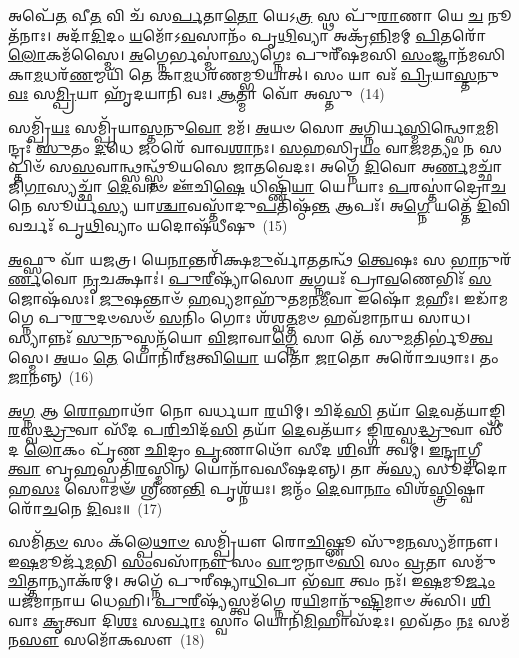 {\anuvakamend[{𑌆 𑌤\-\ul{𑌵𑍋}\-𑌰𑍍𑌜𑌾\-𑌽\-\ul{𑌨𑍁} 𑌷𑍋𑌡᳴𑌶 𑌚}]}%

𑌅𑌪𑍇᳴\-\ul{𑌤} 𑌵𑍀\-\ul{𑌤} 𑌵𑌿 𑌚᳴ 𑌸\-\ul{𑌰𑍍𑌪}\-𑌤𑌾\-\ul{𑌤𑍋} 𑌯𑍇\-𑌽\-\ul{𑌤𑍍𑌰} 𑌸𑍍𑌥 𑌪𑍁᳴\-\ul{𑌰𑌾}\-𑌣𑌾 𑌯𑍇 \ul{𑌚} 𑌨𑍂𑌤᳴𑌨𑌾𑌃। 𑌅𑌦𑌾᳴\-\ul{𑌦𑌿}\-𑌦𑌂 \ul{𑌯}\-𑌮𑍋᳴\-𑌽\-\ul{𑌵}\-𑌸𑌾𑌨𑌂᳴ 𑌪𑍃\-\ul{𑌥𑌿}\-𑌵𑍍𑌯𑌾 𑌅𑌕𑍍𑌰᳴\-\ul{𑌨𑍍𑌨𑌿}\-𑌮𑌮𑍍 \ul{𑌪𑌿}\-𑌤𑌰𑍋᳴ \ul{𑌲𑍋}\-𑌕𑌮᳴𑌸𑍍𑌮𑍈। \ul{𑌅}\-𑌗𑍍𑌨𑍇𑌰𑍍𑌭𑌸𑍍𑌮𑌾॑\-\ul{𑌸𑍍𑌯}\-𑌗𑍍𑌨𑍇𑌃 𑌪𑍁𑌰𑍀᳴𑌷𑌮𑌸𑌿 \ul{𑌸𑌂}\-𑌜𑍍𑌞𑌾𑌨᳴𑌮𑌸𑌿 𑌕𑌾\-\ul{𑌮}\-𑌧𑌰᳴\-\ul{𑌣}\-𑌮𑍍𑌮𑌯𑌿᳴ 𑌤𑍇 𑌕𑌾\-\ul{𑌮}\-𑌧𑌰᳴𑌣𑌮𑍍𑌭𑍂𑌯𑌾𑌤𑍍। 𑌸𑌂 𑌯𑌾 𑌵𑌃᳴ \ul{𑌪𑍍𑌰𑌿}\-𑌯𑌾\-\ul{𑌸𑍍𑌤}\-𑌨𑍁\-\ul{𑌵𑌃} 𑌸\-\ul{𑌮𑍍𑌪𑍍𑌰𑌿}\-𑌯𑌾 𑌹𑍃᳴𑌦𑌯𑌾𑌨𑌿 𑌵𑌃। \ul{𑌆}\-𑌤𑍍𑌮𑌾 𑌵𑍋᳴ 𑌅𑌸𑍍𑌤𑍁~(14)

𑌸𑌮𑍍𑌪𑍍𑌰𑌿᳴\-\ul{𑌯𑌃} 𑌸𑌮𑍍𑌪𑍍𑌰𑌿᳴𑌯𑌾\-\ul{𑌸𑍍𑌤}\-𑌨𑍁\-\ul{𑌵𑍋} 𑌮𑌮᳴। \ul{𑌅}\-𑌯𑍞 𑌸𑍋 \ul{𑌅}\-𑌗𑍍𑌨𑌿𑌰𑍍𑌯\-\ul{𑌸𑍍𑌮𑌿}\-𑌨𑍍𑌥𑍍𑌸𑍋\-\ul{𑌮}\-𑌮𑌿𑌨𑍍𑌦𑍍𑌰𑌃᳴ \ul{𑌸𑍁}\-𑌤𑌂 \ul{𑌦}\-𑌧𑍇 \ul{𑌜}\-𑌠𑌰𑍇᳴ 𑌵𑌾𑌵\-\ul{𑌶𑌾}\-𑌨𑌃। \ul{𑌸}\-\-\ul{𑌹}\-𑌸𑍍𑌰𑌿\-\ul{𑌯𑌂} 𑌵𑌾\-\ul{𑌜}\-𑌮\-\ul{𑌤𑍍𑌯𑌂} 𑌨 𑌸𑌪𑍍𑌤𑌿𑍞᳴ 𑌸\-\ul{𑌸}\-𑌵𑌾𑌨𑍍𑌥𑍍𑌸𑌨𑍍𑌥𑍍𑌸𑍍𑌤𑍂᳴𑌯𑌸𑍇 𑌜𑌾𑌤𑌵𑍇𑌦𑌃। 𑌅𑌗𑍍𑌨𑍇᳴ \ul{𑌦𑌿}\-𑌵𑍋 𑌅\-\ul{𑌰𑍍𑌣}\-𑌮𑌚𑍍𑌛𑌾᳴ 𑌜𑌿\-\ul{𑌗𑌾}\-𑌸𑍍𑌯𑌚𑍍𑌛𑌾᳴ \ul{𑌦𑍇}\-𑌵𑌾𑍞 𑌊᳴𑌚𑌿\-\ul{𑌷𑍇} 𑌧𑌿𑌷𑍍𑌣𑌿᳴\-\ul{𑌯𑌾} 𑌯𑍇। 𑌯𑌾𑌃 \ul{𑌪}\-𑌰𑌸𑍍𑌤𑌾॑𑌦𑍍𑌰𑍋\-\ul{𑌚}\-𑌨𑍇 𑌸𑍂𑌰𑍍𑌯᳴\-\ul{𑌸𑍍𑌯} 𑌯𑌾\-\ul{𑌶𑍍𑌚𑌾}\-𑌵𑌸𑍍𑌤𑌾᳴𑌦𑍁\-\ul{𑌪}\-𑌤𑌿𑌷𑍍𑌠᳴\-\ul{𑌨𑍍𑌤} 𑌆𑌪𑌃᳴। 𑌅\-\ul{𑌗𑍍𑌨𑍇} 𑌯𑌤𑍍𑌤𑍇᳴ \ul{𑌦𑌿}\-𑌵𑌿 𑌵𑌰𑍍𑌚𑌃᳴ 𑌪𑍃\-\ul{𑌥𑌿}\-𑌵𑍍𑌯𑌾𑌂 𑌯𑌦𑍋𑌷᳴𑌧𑍀𑌷𑍁~(15)

\-\ul{𑌅}\-𑌫𑍍𑌸𑍁 𑌵𑌾᳴ 𑌯𑌜𑌤𑍍𑌰। 𑌯𑍇\-\ul{𑌨𑌾}\-𑌨𑍍𑌤𑌰𑌿᳴𑌕𑍍𑌷\-\ul{𑌮𑍁}\-𑌰𑍍𑌵𑌾᳴\-\ul{𑌤}\-𑌤𑌨𑍍𑌥᳴ \ul{𑌤𑍍𑌵𑍇}\-𑌷𑌃 𑌸 \ul{𑌭𑌾}\-𑌨𑍁𑌰᳴\-\ul{𑌰𑍍𑌣}\-𑌵𑍋 \ul{𑌨𑍃}\-𑌚𑌕𑍍𑌷𑌾𑌃॑। \ul{𑌪𑍁}\-\-\ul{𑌰𑍀}\-𑌷𑍍𑌯𑌾᳴𑌸𑍋 \ul{𑌅}\-𑌗𑍍𑌨𑌯𑌃᳴ 𑌪𑍍𑌰𑌾\-\ul{𑌵}\-𑌣𑍇𑌭𑌿𑌃᳴ \ul{𑌸}\-𑌜𑍋𑌷᳴𑌸𑌃। \ul{𑌜𑍁}\-𑌷𑌨𑍍𑌤𑌾𑍞᳴ \ul{𑌹}\-𑌵𑍍𑌯𑌮𑌾𑌹𑍁᳴𑌤𑌮𑌨\-\ul{𑌮𑍀}\-𑌵𑌾 𑌇𑌷𑍋᳴ \ul{𑌮}\-𑌹𑍀𑌃। 𑌇𑌡𑌾᳴𑌮𑌗𑍍𑌨𑍇 𑌪𑍁\-\ul{𑌰𑍁}\-𑌦𑍞𑌸𑍞᳴ \ul{𑌸}\-𑌨𑌿𑌂 𑌗𑍋𑌃 𑌶᳴𑌶𑍍𑌵\-\ul{𑌤𑍍𑌤}\-𑌮𑍞 𑌹𑌵᳴𑌮𑌾𑌨𑌾𑌯 𑌸𑌾𑌧। 𑌸𑍍𑌯𑌾𑌨𑍍𑌨𑌃᳴ \ul{𑌸𑍁}\-𑌨𑍁𑌸𑍍𑌤𑌨᳴𑌯𑍋 \ul{𑌵𑌿}\-𑌜𑌾𑌵𑌾\-\ul{𑌗𑍍𑌨𑍇} 𑌸𑌾 𑌤𑍇᳴ 𑌸𑍁\-\ul{𑌮}\-𑌤𑌿𑌰𑍍𑌭𑍂॑\-\ul{𑌤𑍍𑌵}\-𑌸𑍍𑌮𑍇। \ul{𑌅}\-𑌯𑌂 \ul{𑌤𑍇} 𑌯𑍋𑌨𑌿᳴𑌰𑍍\mbox{}\-\ul{𑌋}\-𑌤𑍍𑌵𑌿\-\ul{𑌯𑍋} 𑌯𑌤𑍋᳴ \ul{𑌜𑌾}\-𑌤𑍋 𑌅𑌰𑍋᳴𑌚𑌥𑌾𑌃। 𑌤𑌂 \ul{𑌜𑌾}\-𑌨𑌨𑍍𑌨𑍍~(16)

\-\ul{𑌅}\-\-\ul{𑌗𑍍𑌨} 𑌆 \ul{𑌰𑍋}\-𑌹𑌾𑌥𑌾᳴ 𑌨𑍋 𑌵𑌰𑍍𑌧𑌯𑌾 \ul{𑌰}\-𑌯𑌿𑌮𑍍। 𑌚𑌿𑌦᳴\-\ul{𑌸𑌿} 𑌤𑌯𑌾᳴ \ul{𑌦𑍇}\-𑌵𑌤᳴𑌯𑌾𑌙𑍍𑌗𑌿\-\ul{𑌰}\-𑌸𑍍𑌵\-\ul{𑌦𑍍𑌧𑍍𑌰𑍁}\-𑌵𑌾 𑌸𑍀᳴𑌦 𑌪\-\ul{𑌰𑌿}\-𑌚𑌿𑌦᳴\-\ul{𑌸𑌿} 𑌤𑌯𑌾᳴ \ul{𑌦𑍇}\-𑌵𑌤᳴𑌯𑌾\-𑌽 𑌙𑍍𑌗𑌿\-\ul{𑌰}\-𑌸𑍍𑌵\-\ul{𑌦𑍍𑌧𑍍𑌰𑍁}\-𑌵𑌾 𑌸𑍀᳴𑌦 \ul{𑌲𑍋}\-𑌕𑌂 𑌪𑍃᳴𑌣 \ul{𑌛𑌿}\-𑌦𑍍𑌰𑌂 \ul{𑌪𑍃}\-𑌣𑌾𑌥𑍋᳴ 𑌸𑍀𑌦 \ul{𑌶𑌿}\-𑌵𑌾 𑌤𑍍𑌵𑌮𑍍। \ul{𑌇}\-\-\ul{𑌨𑍍𑌦𑍍𑌰𑌾}\-𑌗𑍍𑌨𑍀 \ul{𑌤𑍍𑌵𑌾} 𑌬𑍃\-\ul{𑌹}\-𑌸𑍍𑌪𑌤𑌿᳴\-\ul{𑌰}\-𑌸𑍍𑌮𑌿𑌨𑍍 𑌯𑍋𑌨𑌾᳴𑌵𑌸𑍀𑌷𑌦𑌨𑍍𑌨𑍍। 𑌤𑌾 𑌅᳴\-\ul{𑌸𑍍𑌯} 𑌸𑍂𑌦᳴𑌦𑍋𑌹\-\ul{𑌸𑌃} 𑌸𑍋𑌮𑍟᳴ 𑌶𑍍𑌰𑍀𑌣\-\ul{𑌨𑍍𑌤𑌿} 𑌪𑍃𑌶𑍍𑌨᳴𑌯𑌃। 𑌜𑌨𑍍𑌮𑌂᳴ \ul{𑌦𑍇}\-𑌵𑌾\-\ul{𑌨𑌾𑌂} 𑌵𑌿𑌶᳴\-\ul{𑌸𑍍𑌤𑍍𑌰𑌿}\-𑌷𑍍𑌵𑌾 𑌰𑍋᳴\-\ul{𑌚}\-𑌨𑍇 \ul{𑌦𑌿}\-𑌵𑌃॥~(17)

{\anuvakamend[{\-\ul{𑌅}\-𑌸𑍍𑌤𑍍𑌵𑍋𑌷᳴𑌧𑍀𑌷𑍁 \ul{𑌜𑌾}\-𑌨\-\ul{𑌨𑍍𑌨}\-𑌷𑍍𑌟𑌾𑌚᳴𑌤𑍍𑌵𑌾𑌰𑌿𑍞𑌶𑌚𑍍𑌚}]}%

𑌸𑌮𑌿᳴\-\ul{𑌤}\-\-\ul{𑍞} 𑌸𑌂 𑌕᳴𑌲𑍍𑌪𑍇\-\ul{𑌥𑌾}\-\-\ul{𑍞} 𑌸𑌮𑍍𑌪𑍍𑌰𑌿᳴𑌯𑍗 𑌰𑍋\-\ul{𑌚𑌿}\-𑌷𑍍𑌣𑍂 𑌸𑍁᳴𑌮\-\ul{𑌨}\-𑌸𑍍𑌯𑌮𑌾᳴𑌨𑍗। 𑌇\-\ul{𑌷}\-𑌮𑍂𑌰𑍍𑌜᳴\-\ul{𑌮}\-𑌭𑌿 \ul{𑌸𑌂}\-𑌵𑌸𑌾᳴\-\ul{𑌨𑍗} 𑌸𑌂 \ul{𑌵𑌾}\-𑌮𑍍𑌮𑌨𑌾𑍞᳴\-\ul{𑌸𑌿} 𑌸𑌂 \ul{𑌵𑍍𑌰}\-𑌤𑌾 𑌸𑌮𑍁᳴ \ul{𑌚𑌿}\-𑌤𑍍𑌤𑌾𑌨𑍍𑌯𑌾𑌕᳴𑌰𑌮𑍍। 𑌅𑌗𑍍𑌨𑍇᳴ 𑌪𑍁𑌰𑍀𑌷𑍍𑌯𑌾\-\ul{𑌧𑌿}\-𑌪𑌾 𑌭᳴\-\ul{𑌵𑌾} 𑌤𑍍𑌵𑌂 𑌨𑌃᳴। 𑌇\-\ul{𑌷}\-𑌮𑍂\-\ul{𑌰𑍍𑌜𑌂} 𑌯𑌜᳴𑌮𑌾𑌨𑌾𑌯 𑌧𑍇𑌹𑌿। \ul{𑌪𑍁}\-\-\ul{𑌰𑍀}\-𑌷𑍍𑌯᳴𑌸𑍍𑌤𑍍𑌵𑌮᳴𑌗𑍍𑌨𑍇 𑌰\-\ul{𑌯𑌿}\-𑌮𑌾𑌨𑍍𑌪𑍁᳴\-\ul{𑌷𑍍𑌟𑌿}\-𑌮𑌾𑍞 𑌅᳴𑌸𑌿। \ul{𑌶𑌿}\-𑌵𑌾𑌃 \ul{𑌕𑍃}\-𑌤𑍍𑌵𑌾 𑌦𑌿\-\ul{𑌶𑌃} 𑌸\-\ul{𑌰𑍍𑌵𑌾𑌃} 𑌸𑍍𑌵𑌾𑌂 𑌯𑍋𑌨𑌿᳴\-\ul{𑌮𑌿}\-𑌹𑌾𑌸᳴𑌦𑌃। 𑌭𑌵᳴𑌤𑌂 \ul{𑌨𑌃} 𑌸𑌮᳴𑌨\-\ul{𑌸𑍗} 𑌸𑌮𑍋᳴𑌕𑌸𑍗~(18)

